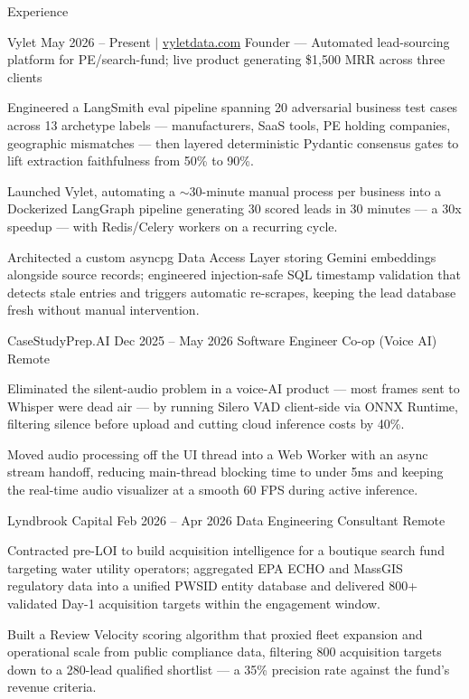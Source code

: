 \documentclass[
	11pt
]{../../../template}
\begin{document}
	\begin{rSection}{E}{xperience}
		\begin{rSectionEntry}
			{Vylet}
			{May 2026 -- Present $\vert$ \href{https://vyletdata.com}{vyletdata.com}}
			{Founder --- Automated lead-sourcing platform for PE/search-fund; live product generating \$1,500 MRR across three clients}
			{}
			{}

			\item Engineered a LangSmith eval pipeline spanning 20 adversarial business test cases across 13 archetype labels --- manufacturers, SaaS tools, PE holding companies, geographic mismatches --- then layered deterministic Pydantic consensus gates to lift extraction faithfulness from 50\% to 90\%.
			\item Launched Vylet, automating a $\sim$30-minute manual process per business into a Dockerized LangGraph pipeline generating 30 scored leads in 30 minutes --- a 30x speedup --- with Redis/Celery workers on a recurring cycle.
			\item Architected a custom asyncpg Data Access Layer storing Gemini embeddings alongside source records; engineered injection-safe SQL timestamp validation that detects stale entries and triggers automatic re-scrapes, keeping the lead database fresh without manual intervention.
		\end{rSectionEntry}

		\begin{rSectionEntry}
			{CaseStudyPrep.AI}
			{Dec 2025 -- May 2026}
			{Software Engineer Co-op (Voice AI)}
			{}
			{Remote}

			\item Eliminated the silent-audio problem in a voice-AI product --- most frames sent to Whisper were dead air --- by running Silero VAD client-side via ONNX Runtime, filtering silence before upload and cutting cloud inference costs by 40\%.
			\item Moved audio processing off the UI thread into a Web Worker with an async stream handoff, reducing main-thread blocking time to under 5ms and keeping the real-time audio visualizer at a smooth 60 FPS during active inference.
		\end{rSectionEntry}

		\begin{rSectionEntry}
			{Lyndbrook Capital}
			{Feb 2026 -- Apr 2026}
			{Data Engineering Consultant}
			{}
			{Remote}

			\item Contracted pre-LOI to build acquisition intelligence for a boutique search fund targeting water utility operators; aggregated EPA ECHO and MassGIS regulatory data into a unified PWSID entity database and delivered 800+ validated Day-1 acquisition targets within the engagement window.
			\item Built a Review Velocity scoring algorithm that proxied fleet expansion and operational scale from public compliance data, filtering 800 acquisition targets down to a 280-lead qualified shortlist --- a 35\% precision rate against the fund's revenue criteria.
		\end{rSectionEntry}

	\end{rSection}
\end{document}
